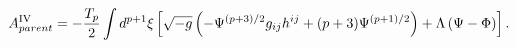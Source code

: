 \begin{equation}
A^{{\rm IV}}_{parent}=-\frac{T_p}{2}\int d^{p+1}{\xi}\left[\sqrt{-g}
\left(-{\Psi}^{(p+3)/2}g_{ij}h^{ij}+(p+3){\Psi}^{(p+1)/2}\right)
+{\Lambda}\left({\Psi}-{\Phi}\right)\right].
\end{equation}

